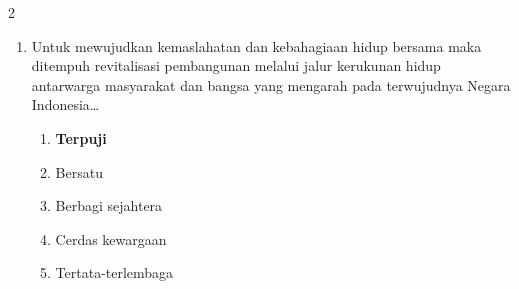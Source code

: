 \documentclass[10pt,a4paper]{article}
\begin{document}
\begin{multicols}{2}
\begin{enumerate}
  \item Untuk mewujudkan kemaslahatan dan kebahagiaan hidup bersama maka ditempuh revitalisasi pembangunan melalui jalur kerukunan hidup antarwarga masyarakat dan bangsa yang mengarah pada terwujudnya Negara Indonesia\dots
    \begin{enumerate}
    \item \textbf{Terpuji}
    \item Bersatu
    \item Berbagi sejahtera
    \item Cerdas kewargaan
    \item Tertata-terlembaga
    \end{enumerate}
  \end{enumerate}

\end{multicols}
\end{document}
